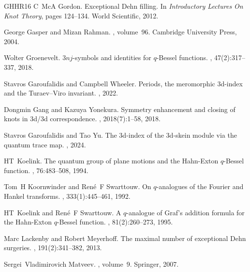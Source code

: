 \documentclass[11pt]{amsart}
\begin{document}
\begin{thebibliography}{GHHR16}
C~McA Gordon.
\newblock Exceptional {D}ehn filling.
\newblock In {\em Introductory Lectures On Knot Theory}, pages 124--134. World
  Scientific, 2012.

George Gasper and Mizan Rahman.
, volume~96.
\newblock Cambridge University Press, 2004.

Wolter Groenevelt.
\newblock $3nj$-symbols and identities for $q$-{B}essel functions.
, 47(2):317--337, 2018.

Stavros Garoufalidis and Campbell Wheeler.
\newblock Periods, the meromorphic 3d-index and the {T}uraev--{V}iro invariant.
, 2022.

Dongmin Gang and Kazuya Yonekura.
\newblock Symmetry enhancement and closing of knots in 3d/3d correspondence.
, 2018(7):1--58, 2018.

Stavros Garoufalidis and Tao Yu.
\newblock The 3d-index of the 3d-skein module via the quantum trace map.
, 2024.

HT~Koelink.
\newblock The quantum group of plane motions and the {H}ahn-{E}xton
  $q$-{B}essel function.
, 76:483--508, 1994.

Tom~H Koornwinder and Ren{\'e}~F Swarttouw.
\newblock On $q$-analogues of the {F}ourier and {H}ankel transforms.
,
  333(1):445--461, 1992.

HT~Koelink and Ren{\'e}~F Swarttouw.
\newblock A $q$-analogue of {G}raf's addition formula for the {H}ahn-{E}xton
  $q$-{B}essel function.
, 81(2):260--273, 1995.

Marc Lackenby and Robert Meyerhoff.
\newblock The maximal number of exceptional {D}ehn surgeries.
, 191(2):341--382, 2013.

Sergei~Vladimirovich Matveev.
,
  volume~9.
\newblock Springer, 2007.


\end{thebibliography}
\end{document}
